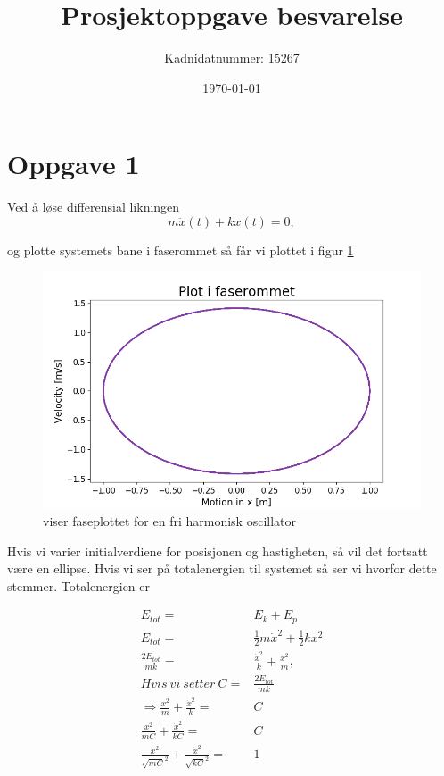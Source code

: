 \documentclass[norsk,a4paper,12pt]{article}
\title{Prosjektoppgave besvarelse}
\author{Kadnidatnummer: 15267}
\date{\today}
\begin{document}
\maketitle


\section*{Oppgave 1}

Ved å løse differensial likningen
\\

\begin{equation}
	m\ddot{x}(t) + kx(t) =0,
\end{equation}

og plotte systemets bane i faserommet så får vi plottet i figur \ref{fig:plotoppg1}
\\
\begin{figure}[H]
\begin{center}
\includegraphics[scale=0.5]{Oppgave1fase.png}
\caption{viser faseplottet for en fri harmonisk oscillator}
\label{fig:plotoppg1}
\end{center}
\end{figure}

Hvis vi varier initialverdiene for posisjonen og hastigheten, så vil det fortsatt være en ellipse. Hvis vi ser på totalenergien til systemet så ser vi hvorfor dette stemmer. Totalenergien er 

\begin{align*}
	E_{tot} =& E_k + E_p\\
	E_{tot} =& \frac{1}{2}m\dot{x}^2 + \frac{1}{2}kx^2\\
	\frac{2E_{tot}}{mk} =& \frac{\dot{x}^2}{k} + \frac{x^2}{m},\\
	Hvis\ vi\ setter\ C =& \frac{2E_{tot}}{mk}\\
	\Rightarrow \frac{x^2}{m} + \frac{\dot{x}^2}{k} =& C \\
	\frac{x^2}{mC} + \frac{\dot{x}^2}{kC} =& C \\
	\frac{x^2}{\sqrt{mC}^2} + \frac{\dot{x}^2}{\sqrt{kC}^2} =& 1 \\
\end{align*}
\end{document}
